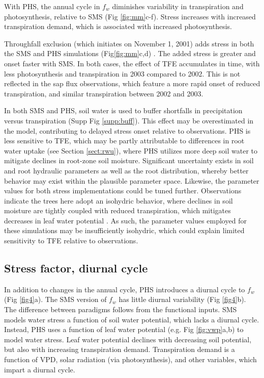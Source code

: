 \documentclass[draft,linenumbers]{agujournal}
\begin{document}
With PHS, the annual cycle in $f_w$ diminishes variability in transpiration and photosynthesis, relative to SMS (Fig \ref{fig:mm}c-f).
Stress increases with increased transpiration demand, which is associated with increased photosynthesis.


Throughfall exclusion (which initiates on November 1, 2001) adds stress in both the SMS and PHS simulations (Fig\ref{fig:mm}c,d) .
The added stress is greater and onset faster with SMS.
In both cases, the effect of TFE accumulates in time, with less photosynthesis and transpiration in 2003 compared to 2002.
This is not reflected in the sap flux observations, which feature a more rapid onset of reduced transpiration, and similar transpiration between 2002 and 2003.

In both SMS and PHS, soil water is used to buffer shortfalls in precipitation versus transpiration (Supp Fig \ref{supp:buff}).
This effect may be overestimated in the model, contributing to delayed stress onset relative to observations.
PHS is less sensitive to TFE, which may be partly attributable to differences in root water uptake (see Section \ref{sect:rwu}), 
where PHS utilizes more deep soil water to mitigate declines in root-zone soil moisture.
Significant uncertainty exists in soil and root hydraulic parameters as well as the root distribution, whereby better behavior may exist within the plausible parameter space.
Likewise, the parameter values for both stress implementations could be tuned further.
Observations indicate the trees here adopt an isohydric behavior, where declines in soil moisture 
are tightly coupled with reduced transpiration, which mitigates decreases in leaf water potential \citep{fisher2006}.
As such, the parameter values employed for these simulations may be insufficiently isohydric, which could explain limited sensitivity to TFE relative to observations.

\subsection{Stress factor, diurnal cycle}

In addition to changes in the annual cycle, PHS introduces a diurnal cycle to $f_w$ (Fig \ref{fig4}a). 
The SMS version of $f_w$ has little diurnal variability (Fig \ref{fig4}b).
The difference between paradigms follows from the functional inputs.
SMS models water stress a function of soil water potential, which lacks a diurnal cycle.
Instead, PHS uses a function of leaf water potential (e.g. Fig \ref{fig:vwp}a,b) to model water stress.
Leaf water potential declines with decreasing soil potential, but also with increasing transpiration demand.
Transpiration demand is a function of VPD, solar radiation (via photosynthesis), and other variables, which impart a diurnal cycle.
\end{document}
